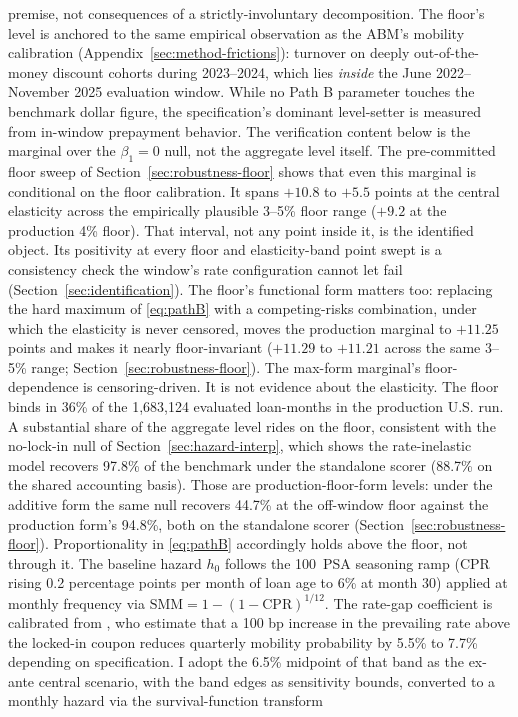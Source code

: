 \documentclass[12pt]{article}
\begin{document}
premise, not consequences of a strictly-involuntary decomposition. The floor's level is anchored to the same empirical observation as the ABM's mobility calibration (Appendix~\ref{sec:method-frictions}): turnover on deeply out-of-the-money discount cohorts during 2023--2024, which lies \emph{inside} the June 2022--November 2025 evaluation window. While no Path B parameter touches the benchmark dollar figure, the specification's dominant level-setter is measured from in-window prepayment behavior. The verification content below is the marginal over the $\beta_1 = 0$ null, not the aggregate level itself. The pre-committed floor sweep of Section~\ref{sec:robustness-floor} shows that even this marginal is conditional on the floor calibration. It spans $+10.8$ to $+5.5$ points at the central elasticity across the empirically plausible 3--5\% floor range ($+9.2$ at the production 4\% floor). That interval, not any point inside it, is the identified object. Its positivity at every floor and elasticity-band point swept is a consistency check the window's rate configuration cannot let fail (Section~\ref{sec:identification}). The floor's functional form matters too: replacing the hard maximum of \eqref{eq:pathB} with a competing-risks combination, under which the elasticity is never censored, moves the production marginal to $+11.25$ points and makes it nearly floor-invariant ($+11.29$ to $+11.21$ across the same 3--5\% range; Section~\ref{sec:robustness-floor}). The max-form marginal's floor-dependence is censoring-driven. It is not evidence about the elasticity. The floor binds in 36\% of the 1,683,124 evaluated loan-months in the production U.S. run. A substantial share of the aggregate level rides on the floor, consistent with the no-lock-in null of Section~\ref{sec:hazard-interp}, which shows the rate-inelastic model recovers 97.8\% of the benchmark under the standalone scorer (88.7\% on the shared accounting basis). Those are production-floor-form levels: under the additive form the same null recovers 44.7\% at the off-window floor against the production form's 94.8\%, both on the standalone scorer (Section~\ref{sec:robustness-floor}). Proportionality in \eqref{eq:pathB} accordingly holds above the floor, not through it. The baseline hazard $h_0$ follows the 100~PSA seasoning ramp (CPR rising 0.2 percentage points per month of loan age to 6\% at month 30) applied at monthly frequency via $\mathrm{SMM} = 1-(1-\mathrm{CPR})^{1/12}$. The rate-gap coefficient is calibrated from \citet{liebersohn2024}, who estimate that a 100 bp increase in the prevailing rate above the locked-in coupon reduces quarterly mobility probability by 5.5\% to 7.7\% depending on specification. I adopt the 6.5\% midpoint of that band as the ex-ante central scenario, with the band edges as sensitivity bounds, converted to a monthly hazard via the survival-function transform
\end{document}

